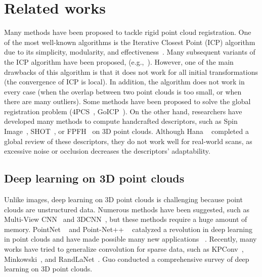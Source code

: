 \documentclass[10pt,twocolumn,letterpaper]{article}
\begin{document}
\section{Related works}
Many methods have been proposed to tackle rigid point cloud registration. One of the most well-known algorithms is the Iterative Closest Point (ICP) algorithm~\cite{121791} due to its simplicity, modularity, and effectiveness~\cite{rusinkiewicz_efficient_2001, gelfand_geometrically_2003, bouaziz_sparse_2013}. Many subsequent variants of the ICP algorithm have been proposed, (e.g.,~\cite{rusinkiewicz_efficient_2001, bouaziz_sparse_2013}). However, one of the main drawbacks of this algorithm is that it does not work for all initial transformations (the convergence of ICP is local). In addition, the algorithm does not work in every case (when the overlap between two point clouds is too small, or when there are many outliers). Some methods have been proposed to solve the global registration problem (4PCS~\cite{aiger_4-points_nodate}, GoICP~\cite{yang_go-icp:_2016}).
On the other hand, researchers have developed many methods to compute handcrafted descriptors, such as Spin Image~\cite{johnson_using_1999}, SHOT~\cite{Salti2014SHOTUS}, or FPFH~\cite{rusu_fast_2009} on 3D point clouds. 
Although Hana \etal ~\cite{hana_comprehensive_2018} completed a global review of these descriptors, they do not work well for real-world scans, as excessive noise or occlusion decreases the descriptors' adaptability.
\subsection{Deep learning on 3D point clouds}
Unlike images, deep learning on 3D point clouds is challenging because point clouds are unstructured data. Numerous methods have been suggested, such as Multi-View CNN~\cite{su2015multiview} and 3DCNN~\cite{maturana2015}, but these methods require a huge amount of memory. PointNet ~\cite{qi2016pointnet} and Point-Net++  ~\cite{qi2017pointnet} catalyzed a revolution in deep learning in point clouds and have made possible many new applications ~\cite{deng2018ppffoldnet, aoki2019pointnetlk, deng2018ppfnet, Zhao_2019_CVPR}.
Recently, many works have tried to generalize convolution for sparse data, such as KPConv~\cite{thomas2019KPConv}, Minkowski~\cite{choy20194d}, and RandLaNet~\cite{hu2019randla}. Guo \etal \cite{guo2020survey} conducted a comprehensive survey of deep learning on 3D point clouds.
\end{document}
